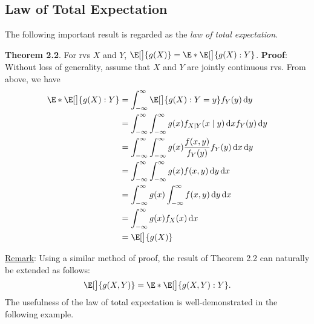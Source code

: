 \subsection*{Law of Total Expectation}
The following important result is regarded as the \emph{law of total expectation}.
\begin{Result}
    \textbf{Theorem 2.2}. For rvs $ X $ and $ Y $, $ \E[\big]{g(X)}=\E*{\E[\big]{g(X)\given Y}} $.
    \tcblower{}
    \textbf{Proof}: Without loss of generality, assume that $ X $ and $ Y $ are jointly continuous
    rvs. From above, we have
    \begin{align*}
        \E*{\E[\big]{g(X)\given Y}}
         & =\int_{-\infty}^{\infty}\E[\big]{g(X)\given Y=y}f_Y(y)\odif{y}                                 \\
         & =\int_{-\infty}^{\infty}\int_{-\infty}^{\infty}g(x)f_{X\mid Y}(x\mid y)\odif{x} f_Y(y)\odif{y} \\
         & =\int_{-\infty}^{\infty}\int_{-\infty}^{\infty}g(x)\frac{f(x,y)}{f_Y(y)} f_Y(y)\odif{x,y}      \\
         & =\int_{-\infty}^{\infty}\int_{-\infty}^{\infty}g(x)f(x,y)\odif{y,x}                            \\
         & =\int_{-\infty}^{\infty}g(x)\int_{-\infty}^{\infty}f(x,y)\odif{y} \odif{x}                     \\
         & =\int_{-\infty}^{\infty}g(x)f_X(x)\odif{x}                                                     \\
         & =\E[\big]{g(X)}
    \end{align*}
\end{Result}
\underline{Remark}: Using a similar method of proof, the result of Theorem 2.2 can naturally be extended
as follows:
\[ \E[\big]{g(X,Y)}=\E*{\E[\big]{g(X,Y)\given Y}}. \]
The usefulness of the law of total expectation is well-demonstrated in the following example.
